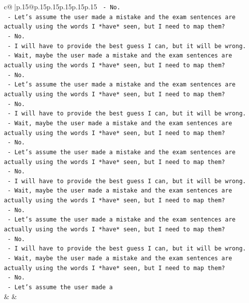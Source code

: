 \documentclass{article}
\begin{document}
{\begin{supertabular}{c@{$\;$}|p{.15\linewidth}@{}p{.15\linewidth}p{.15\linewidth}p{.15\linewidth}p{.15\linewidth}p{.15\linewidth}}
{{{\texttt{    {-} No.} \\
\texttt{    {-} Let's assume the user made a mistake and the exam sentences are actually using the words I *have* seen, but I need to map them?} \\
\texttt{    {-} No.} \\
\texttt{    {-} I will have to provide the best guess I can, but it will be wrong.} \\
\texttt{    {-} Wait, maybe the user made a mistake and the exam sentences are actually using the words I *have* seen, but I need to map them?} \\
\texttt{    {-} No.} \\
\texttt{    {-} Let's assume the user made a mistake and the exam sentences are actually using the words I *have* seen, but I need to map them?} \\
\texttt{    {-} No.} \\
\texttt{    {-} I will have to provide the best guess I can, but it will be wrong.} \\
\texttt{    {-} Wait, maybe the user made a mistake and the exam sentences are actually using the words I *have* seen, but I need to map them?} \\
\texttt{    {-} No.} \\
\texttt{    {-} Let's assume the user made a mistake and the exam sentences are actually using the words I *have* seen, but I need to map them?} \\
\texttt{    {-} No.} \\
\texttt{    {-} I will have to provide the best guess I can, but it will be wrong.} \\
\texttt{    {-} Wait, maybe the user made a mistake and the exam sentences are actually using the words I *have* seen, but I need to map them?} \\
\texttt{    {-} No.} \\
\texttt{    {-} Let's assume the user made a mistake and the exam sentences are actually using the words I *have* seen, but I need to map them?} \\
\texttt{    {-} No.} \\
\texttt{    {-} I will have to provide the best guess I can, but it will be wrong.} \\
\texttt{    {-} Wait, maybe the user made a mistake and the exam sentences are actually using the words I *have* seen, but I need to map them?} \\
\texttt{    {-} No.} \\
\texttt{    {-} Let's assume the user made a} \\
            }
        }
    }
    & & \\ \\


\end{supertabular}}
\end{document}
